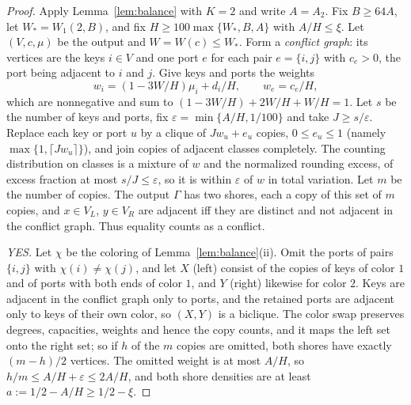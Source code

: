 \documentclass[11pt,letterpaper]{article}
\theoremstyle{definition}
\theoremstyle{remark}
\newcommand{\eps}{\varepsilon}
\begin{document}
\begin{proof}
Apply Lemma~\ref{lem:balance} with \(K=2\) and write \(A=A_2\). Fix \(B\ge
64A\), let \(W_*=W_1(2,B)\), and fix \(H\ge100\max\{W_*,B,A\}\) with
\(A/H\le\xi\). Let \((V,c,\mu)\) be the output and \(W=W(c)\le W_*\).
Form a \emph{conflict graph}: its vertices are the keys \(i\in V\) and one
port \(e\) for each pair \(e=\{i,j\}\) with \(c_e>0\), the port being
adjacent to \(i\) and \(j\). Give keys and ports the weights
\[
w_i=(1-3W/H)\mu_i+d_i/H,\qquad w_e=c_e/H,
\]
which are nonnegative and sum to \((1-3W/H)+2W/H+W/H=1\). Let \(s\) be the
number of keys and ports, fix \(\eps=\min\{A/H,1/100\}\) and take
\(J\ge s/\eps\). Replace each key or port \(u\) by a clique of
\(Jw_u+e_u\) copies, \(0\le e_u\le1\) (namely \(\max\{1,\lceil Jw_u\rceil\}\)),
and join copies of adjacent classes completely. The counting distribution on
classes is a mixture of \(w\) and the normalized rounding excess, of excess
fraction at most \(s/J\le\eps\), so it is within \(\eps\) of \(w\) in total
variation. Let \(m\) be the number of copies. The output \(\Gamma\) has two
shores, each a copy of this set of \(m\) copies, and \(x\in V_L\),
\(y\in V_R\) are adjacent iff they are distinct and not adjacent in the
conflict graph. Thus equality counts as a conflict.

\emph{YES.} Let \(\chi\) be the coloring of Lemma~\ref{lem:balance}(ii).
Omit the ports of pairs \(\{i,j\}\) with \(\chi(i)\ne\chi(j)\), and let
\(X\) (left) consist of the copies of keys of color \(1\) and of ports with
both ends of color \(1\), and \(Y\) (right) likewise for color \(2\). Keys
are adjacent in the conflict graph only to ports, and the retained ports are
adjacent only to keys of their own color, so \((X,Y)\) is a biclique. The
color swap preserves degrees, capacities, weights and hence the copy counts,
and it maps the left set onto the right set; so if \(h\) of the \(m\) copies
are omitted, both shores have exactly \((m-h)/2\) vertices. The omitted
weight is at most \(A/H\), so \(h/m\le A/H+\eps\le2A/H\), and both shore
densities are at least \(a:=1/2-A/H\ge1/2-\xi\).


\end{proof}
\end{document}
